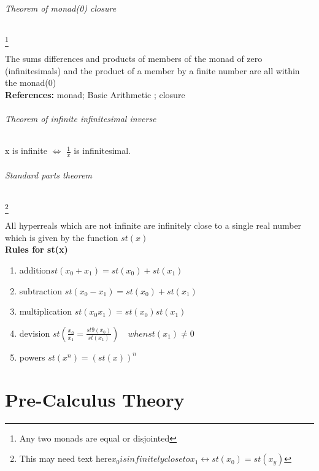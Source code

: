 \documentclass[12pt, a4paper,oneside]{book}
\begin{document}
\paragraph{Theorem of monad(0) closure}  \footnote{Any two monads are equal or disjointed}
\begin{paragraph}
The sums differences and products of members of the monad of zero (infinitesimals) and the product of a member by a finite number are all within the monad(0)\\
\textbf{References:} monad; Basic Arithmetic ; closure
\end{paragraph}
\paragraph{Theorem of infinite infinitesimal inverse }
\begin{paragraph}
x is infinite  \(\Leftrightarrow \) \(\frac{1}{x}\) is infinitesimal.
\end{paragraph}
\paragraph{Standard parts theorem} \footnote{ This may need text here\(x_0 is infinitely close to x_1 \leftrightarrow st(x_0)=st(x_y)\)}
\begin{paragraph}
 All hyperreals which are not infinite are infinitely close to a single real number which is given by the function \(st(x)\) \\
 \textbf{Rules for st(x)}
 \begin{enumerate}
 \item{addition\(st(x_0+x_1)=st(x_0)+st(x_1)\)}
 \item{subtraction \(st(x_0-x_1) = st(x_0)+st(x_1)\)}
 \item{multiplication \(st(x_0 x_1) = st(x_0)st(x_1)\)}
 \item{devision \(st(\frac{x_0}{x_1}=\frac{st9(x_0)}{st(x_1)})\quad when st(x_1)\neq 0\)}
 \item{powers \(st(x^n)=(st(x))^n\) }%
 \end{enumerate}
\end{paragraph}



\part{Pre-Calculus Theory}
\end{document}
